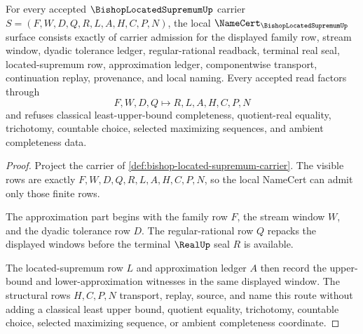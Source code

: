 \begin{theorem}
\label{thm:bishop-located-supremum-namecert-obligations}
For every accepted $\BishopLocatedSupremumUp$ carrier $S=(F,W,D,Q,R,L,A,H,C,P,N)$, the local $\NameCert_{\BishopLocatedSupremumUp}$ surface consists exactly of carrier admission for the displayed family row, stream window, dyadic tolerance ledger, regular-rational readback, terminal real seal, located-supremum row, approximation ledger, componentwise transport, continuation replay, provenance, and local naming. Every accepted read factors through
$$
F,W,D,Q \longmapsto R,L,A,H,C,P,N
$$
and refuses classical least-upper-bound completeness, quotient-real equality, trichotomy, countable choice, selected maximizing sequences, and ambient completeness data.
\end{theorem}
\begin{proof}
Project the carrier of \autoref{def:bishop-located-supremum-carrier}. The visible rows are exactly $F,W,D,Q,R,L,A,H,C,P,N$, so the local NameCert can admit only those finite rows.

The approximation part begins with the family row $F$, the stream window $W$, and the dyadic tolerance row $D$. The regular-rational row $Q$ repacks the displayed windows before the terminal $\RealUp$ seal $R$ is available.

The located-supremum row $L$ and approximation ledger $A$ then record the upper-bound and lower-approximation witnesses in the same displayed window. The structural rows $H,C,P,N$ transport, replay, source, and name this route without adding a classical least upper bound, quotient equality, trichotomy, countable choice, selected maximizing sequence, or ambient completeness coordinate.
\end{proof}

